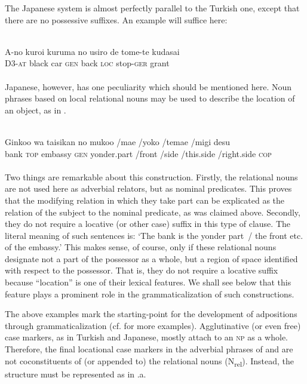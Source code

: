 The Japanese system is almost perfectly parallel to the Turkish one, except that there are no possessive suffixes. An example will suffice here:

\ea\label{ex:E51}
 \\
\gll A-no  kuroi  kuruma  no  usiro  de  tome-te  kudasai\\
D3-\textsc{at}  black  car  \textsc{gen}  back  \textsc{loc}  stop-\textsc{ger}  grant\\
\\
\z
\noindent Japanese, however, has one peculiarity which should be mentioned here. Noun phrases based on local relational nouns may be used to describe the location of an object, as in .

\ea\label{ex:E52}
 \\
\gll  Ginkoo  wa  taisikan  no  mukoo  /mae  /yoko  /temae  /migi  desu\\
bank  \textsc{top}  embassy  \textsc{gen}  yonder.part  /front  /side  /this.side  /right.side  \textsc{cop}\\
\\
\z
\noindent Two things are remarkable about this construction. Firstly, the relational nouns are not used here as adverbial relators, but as nominal predicates. This proves that the modifying relation in which they take part can be explicated as the relation of the subject to the nominal predicate, as was claimed above. Secondly, they do not require a locative (or other case) suffix in this type of clause. The literal meaning of such sentences is: ‘The bank is the yonder part~/ the front etc. of the embassy.’ This makes sense, of course, only if these relational nouns designate not a part of the possessor as a whole, but a region of space identified with respect to the possessor. That is, they do not require a locative suffix because ``location'' is one of their lexical features. We shall see below that this feature plays a prominent role in the grammaticalization of such constructions.

The above examples mark the starting-point for the development of adpositions through grammaticalization (cf. \citealt[446, Fn 5]{MallinsonEtAl1981} for more examples). Agglutinative (or even free) case markers, as in Turkish and Japanese, mostly attach to an \textsc{np} as a whole. Therefore, the final locational case markers in the adverbial phrases of  and  are not coconstituents of (or appended to) the relational nouns (N\textsubscript{rel}). Instead, the structure must be represented as in .a.

